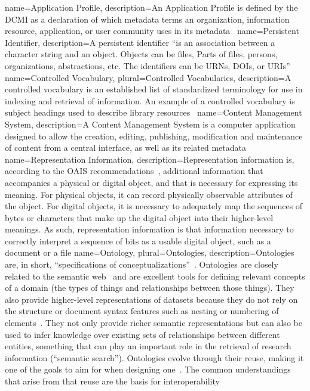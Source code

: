 
{
  name=Application Profile,
  description={An Application Profile is defined by the \gls{DCMI} as a declaration of which metadata terms an organization, information resource, application, or user community uses in its metadata~\cite{Chan2006}}
}
{
  name=Persistent Identifier,
  description={A persistent identifier ``is an association between a character string and an object. Objects can be files, Parts of files, persons, organizations, abstractions, etc. The identifiers can be \glspl{URN}, \glspl{DOI}, or \glspl{URI}''~\cite{Citation2011}}
}
{
  name=Controlled Vocabulary,
  plural=Controlled Vocabularies,
  description={A controlled vocabulary is an established list of standardized terminology for use in indexing and retrieval of information. An example of a controlled vocabulary is subject headings used to describe library resources~\cite{oecd:controlledvocabulary}}
}
{
  name=Content Management System,
  description={A Content Management System is a computer application designed to allow the creation, editing, publishing, modification and maintenance of content from a central interface, as well as its related metadata~\cite{Mauthe2005}}
}
{
  name=Representation Information,
  description={Representation information is, according to the OAIS recommendations~\cite{Systems2002}, additional information that accompanies a physical or digital object, and that is necessary for expressing its meaning. For physical objects, it can record physically observable attributes of the object. For digital objects, it is necessary to adequately map the sequences of bytes or characters that make up the digital object into their higher-level meanings. As such, representation information is that information necessary to correctly interpret a sequence of bits as a usable digital object, such as a document or a file}
}
{
  name=Ontology,
  plural=Ontologies,
  description={Ontologies are, in short, ``specifications of conceptualizations''~\cite{gruber:ontologydefinition}. Ontologies are closely related to the semantic web~\cite{Horrocks2008} and are excellent tools for defining relevant concepts of a domain (the types of things and relationships between those things). They also provide higher-level representations of datasets because they do not rely on the structure or document syntax features such as nesting or numbering of elements~\cite{BULT:BULT283}. They not only provide richer semantic representations but can also be used to infer knowledge over existing sets of relationships between different entities, something that can play an important role in the retrieval of research information (``semantic search''). Ontologies evolve through their reuse, making it one of the goals to aim for when designing one~\cite{Bontas05casestudies}. The common understandings that arise from that reuse are the basis for interoperability~\cite{Annamalai03guidelinesfor}}
}

